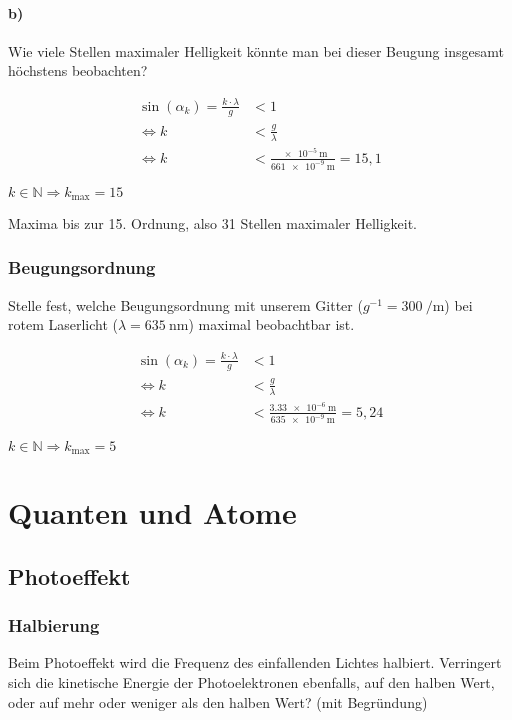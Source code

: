 \documentclass{ajc}
\begin{document}
	\paragraph{b)} Wie viele Stellen maximaler Helligkeit könnte man bei dieser Beugung insgesamt höchstens beobachten?
	
	\begin{equation}
		\begin{split}
			\sin\left(\alpha_k\right)=\frac{k \cdot \lambda}{g} &< 1 \\
			\Leftrightarrow k &< \frac{g}{\lambda} \\
			\Leftrightarrow k &< \frac{\SI{e-5}{\meter}}{\SI{661e-9}{\meter}} = 15,1
		\end{split}
	\end{equation}
	
	$k \in \mathbb{N} \Rightarrow k_{\text{max}} = 15$
	
	Maxima bis zur 15. Ordnung, also 31 Stellen maximaler Helligkeit.
	
	\subsubsection{Beugungsordnung}
	Stelle fest, welche Beugungsordnung mit unserem Gitter ($g^{-1} = \SI[per-mode=reciprocal]{300}{\per\meter}$) bei rotem Laserlicht ($\lambda = \SI{635}{\nm}$) maximal beobachtbar ist.
	
	\begin{equation}
	\begin{split}
		\sin\left(\alpha_k\right)=\frac{k \cdot \lambda}{g} &< 1 \\
		\Leftrightarrow k &< \frac{g}{\lambda} \\
		\Leftrightarrow k &< \frac{\SI{3,33e-6}{\meter}}{\SI{635e-9}{\m}} = 5,24
	\end{split}
	\end{equation}
	
	$k \in \mathbb{N} \Rightarrow k_{\text{max}} = 5$
	
	\section{Quanten und Atome}
	
	\subsection{Photoeffekt}
	
	\subsubsection{Halbierung}
	Beim Photoeffekt wird die Frequenz des einfallenden Lichtes halbiert. Verringert sich die kinetische Energie der Photoelektronen ebenfalls, auf den halben Wert, oder auf mehr oder weniger als den halben Wert? (mit Begründung)
	
\end{document}
